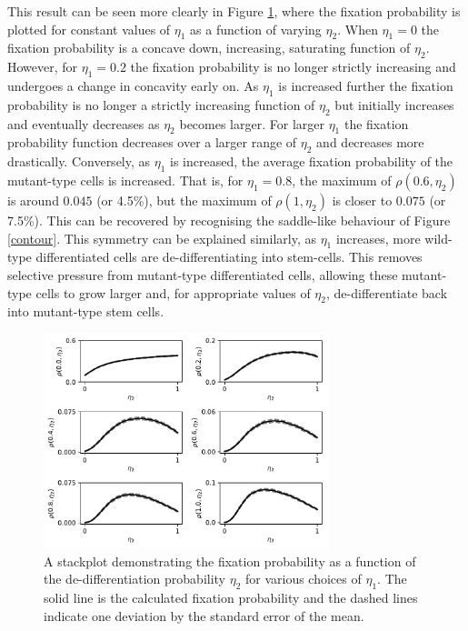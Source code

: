 \documentclass[12pt]{article}
\begin{document}
This result can be seen more clearly in Figure \ref{constantEta1Stack}, where the fixation probability is plotted for constant values of $\eta_1$ as a function of varying $\eta_2$. When $\eta_1=0$ the fixation probability is a concave down, increasing, saturating function of $\eta_2$. However, for $\eta_1=0.2$ the fixation probability is no longer strictly increasing and undergoes a change in concavity early on. As $\eta_1$ is increased further the fixation probability is no longer a strictly increasing function of $\eta_2$ but initially increases and eventually decreases as $\eta_2$ becomes larger. For larger $\eta_1$ the fixation probability function decreases over a larger range of $\eta_2$ and decreases more drastically. Conversely, as $\eta_1$ is increased, the average fixation probability of the mutant-type cells is increased. That is, for $\eta_1=0.8$, the maximum of $\rho(0.6, \eta_2)$ is around $0.045$ (or 4.5\%), but the maximum of $\rho(1, \eta_2)$ is closer to $0.075$ (or 7.5\%). This can be recovered by recognising the saddle-like behaviour of Figure \ref{contour}. This symmetry can be explained similarly, as $\eta_1$ increases, more wild-type differentiated cells are de-differentiating into stem-cells. This removes selective pressure from mutant-type differentiated cells, allowing these mutant-type cells to grow larger and, for appropriate values of $\eta_2$, de-differentiate back into mutant-type stem cells.

\begin{figure}[ht]
\begin{center}
\includegraphics[width=0.74\textwidth]{constant_eta1_stackplot.pdf}
\end{center}
\caption{A stackplot demonstrating the fixation probability as a function of the de-differentiation probability $\eta_2$ for various choices of $\eta_1$. The solid line is the calculated fixation probability and the dashed lines indicate one deviation by the standard error of the mean.}\label{constantEta1Stack}
\end{figure}
\end{document}
